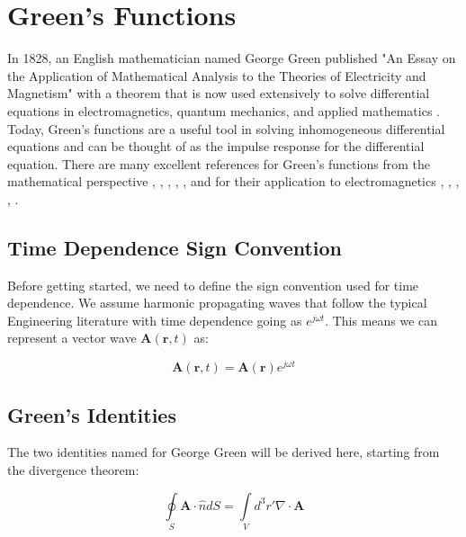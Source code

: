 \chapter{Green's Functions}
In 1828, an English mathematician named George Green published "An Essay on the Application of Mathematical Analysis to the Theories of Electricity and Magnetism" with a theorem that is now used extensively to solve differential equations in electromagnetics, quantum mechanics, and applied mathematics \cite{green_phys_today}. Today, Green's functions are a useful tool in solving inhomogeneous differential equations and can be thought of as the impulse response for the differential equation. There are many excellent references for Green's functions from the mathematical perspective \cite{bender_orszag}, \cite{arfken_weber}, \cite{gbur_math}, \cite{guenther_partial_de}, \cite{duffy_green}, and for their application to electromagnetics \cite{jackson_classical_em}, \cite{zangwill_modern_em}, \cite{balanis_advanced}, \cite{goodman_fourier}, \cite{smith_radiation}.

\section{Time Dependence Sign Convention} \label{gf_sec:time_dependence}
Before getting started, we need to define the sign convention used for time dependence. We  assume harmonic propagating waves that follow the typical Engineering literature with time dependence going as $e^{j\omega t}$. This means we can represent a vector wave $\mathbf{A}(\mathbf{r},t)$ as:

\begin{equation}
\mathbf{A}\left(\mathbf{r},t\right) = \mathbf{A}\left(\mathbf{r}\right)e^{j\omega t}
\label{gf_eq:0a}
\end{equation}
\renewcommand{\baselinestretch}{2} \small\normalsize

\section{Green's Identities}
The two identities named for George Green will be derived here, starting from the divergence theorem:

\begin{equation}
\oint\limits_{S} \mathbf{A} \cdot \hat{n} dS = \int\limits_{V}d^3r'\nabla \cdot \mathbf{A}
\label{gf_eq:1}
\end{equation}
\renewcommand{\baselinestretch}{2} \small\normalsize

